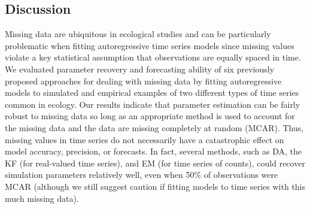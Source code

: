 \documentclass[12pt,english]{article} %
\begin{document}
\begin{linenumbers}
\begin{spacing}{1.9}
\begin{flushleft}
\section*{Discussion}
\vspace{-1.5em}
 \hspace{1em} Missing data are ubiquitous in ecological studies and can be particularly problematic when fitting autoregressive time series models since missing values violate a key statistical assumption that observations are equally spaced in time. We evaluated parameter recovery and forecasting ability of six previously proposed approaches for dealing with missing data by fitting autoregressive models to simulated and empirical examples of two different types of time series common in ecology. Our results indicate that parameter estimation can be fairly robust to missing data so long as an appropriate method is used to account for the missing data and the data are missing completely at random (MCAR). Thus, missing values in time series do not necessarily have a catastrophic effect on model accuracy, precision, or forecasts. In fact, several methods, such as DA, the KF (for real-valued time series), and EM (for time series of counts), could recover simulation parameters relatively well, even when 50\% of observations were MCAR (although we still suggest caution if fitting models to time series with this much missing data). 


\end{flushleft}
\end{spacing}
\end{linenumbers}
\end{document}
